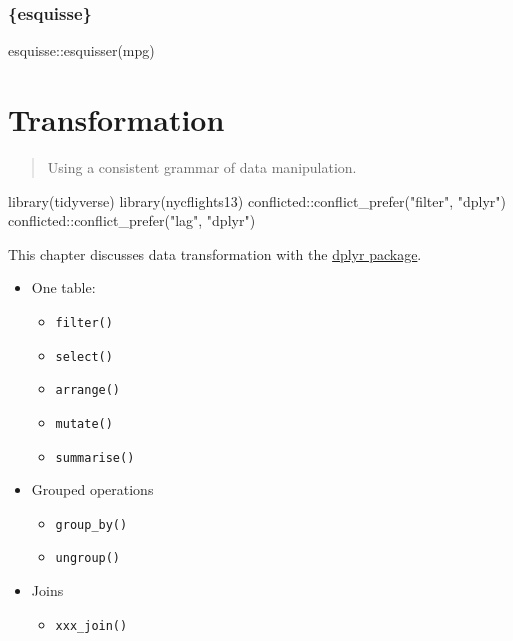 \documentclass[]{book}
\newenvironment{Shaded}{}{}
\newcommand{\KeywordTok}[1]{\textcolor[rgb]{0.00,0.00,1.00}{#1}}
\newcommand{\NormalTok}[1]{#1}
\newcommand{\OperatorTok}[1]{#1}
\newcommand{\StringTok}[1]{\textcolor[rgb]{0.00,0.50,0.50}{#1}}
\providecommand{\tightlist}{%
  \setlength{\itemsep}{0pt}\setlength{\parskip}{0pt}}
\begin{document}
\hypertarget{esquisse}{%
\subsection{\{esquisse\}}\label{esquisse}}

\begin{Shaded}
\begin{Highlighting}[]
\NormalTok{esquisse}\OperatorTok{::}\KeywordTok{esquisser}\NormalTok{(mpg)}
\end{Highlighting}
\end{Shaded}

\hypertarget{transformation}{%
\chapter{Transformation}\label{transformation}}

\begin{quote}
Using a consistent grammar of data manipulation.
\end{quote}

\begin{Shaded}
\begin{Highlighting}[]
\KeywordTok{library}\NormalTok{(tidyverse)}
\KeywordTok{library}\NormalTok{(nycflights13)}
\NormalTok{conflicted}\OperatorTok{::}\KeywordTok{conflict_prefer}\NormalTok{(}\StringTok{"filter"}\NormalTok{, }\StringTok{"dplyr"}\NormalTok{)}
\NormalTok{conflicted}\OperatorTok{::}\KeywordTok{conflict_prefer}\NormalTok{(}\StringTok{"lag"}\NormalTok{, }\StringTok{"dplyr"}\NormalTok{)}
\end{Highlighting}
\end{Shaded}

This chapter discusses data transformation with the \href{https://dplyr.tidyverse.org/}{dplyr package}.

\begin{itemize}
\tightlist
\item
  One table:

  \begin{itemize}
  \tightlist
  \item
    \texttt{filter()}
  \item
    \texttt{select()}
  \item
    \texttt{arrange()}
  \item
    \texttt{mutate()}
  \item
    \texttt{summarise()}
  \end{itemize}
\item
  Grouped operations

  \begin{itemize}
  \tightlist
  \item
    \texttt{group\_by()}
  \item
    \texttt{ungroup()}
  \end{itemize}
\item
  Joins

  \begin{itemize}
  \tightlist
  \item
    \texttt{xxx\_join()}
  \end{itemize}
\end{itemize}
\end{document}
